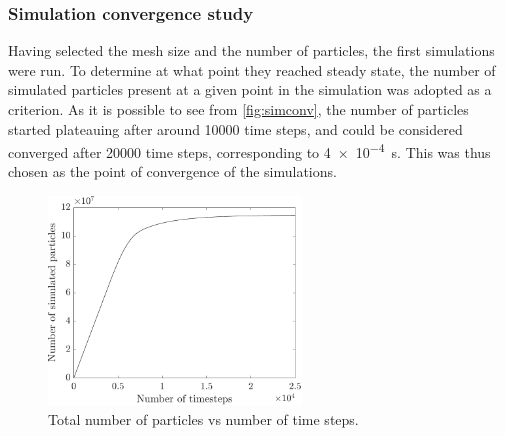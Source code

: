 \subsubsection{Simulation convergence study}
Having selected the mesh size and the number of particles, the first simulations were run. To determine at what point they reached steady state, the number of simulated particles present at a given point in the simulation was adopted as a criterion. As it is possible to see from \autoref{fig:simconv}, the number of particles started plateauing after around 10000 time steps, and could be considered converged after 20000 time steps, corresponding to \qty{4e-4}{\s}. This was thus chosen as the point of convergence of the simulations.
\begin{figure}[h]
    \centering
    \includegraphics[width=0.6\textwidth]{Images/3. Methodology/Simulation convergence/simconv.pdf}
    \caption{Total number of particles vs number of time steps.}
    \label{fig:simconv}
\end{figure}

